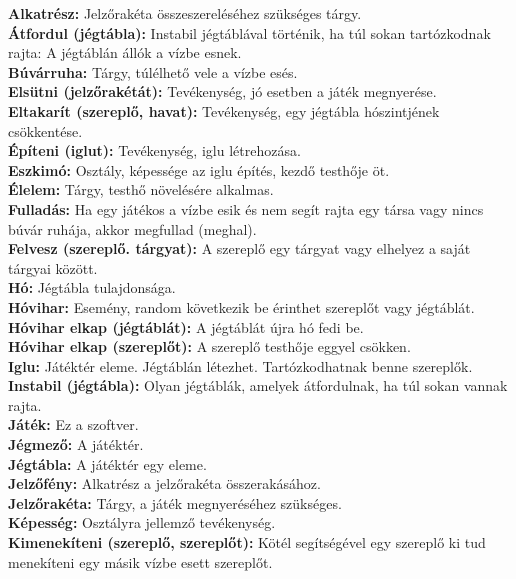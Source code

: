 \textbf{Alkatrész:} Jelzőrakéta összeszereléséhez szükséges tárgy. \\
\textbf{Átfordul (jégtábla):} Instabil jégtáblával történik, ha túl sokan  tartózkodnak rajta: A jégtáblán állók a vízbe esnek. \\
\textbf{Búvárruha:} Tárgy, túlélhető vele a vízbe esés. \\
\textbf{Elsütni (jelzőrakétát):} Tevékenység, jó esetben a játék megnyerése. \\
\textbf{Eltakarít (szereplő, havat):} Tevékenység, egy jégtábla hószintjének csökkentése. \\
\textbf{Építeni (iglut):} Tevékenység, iglu létrehozása. \\
\textbf{Eszkimó:} Osztály, képessége az iglu építés, kezdő testhője öt. \\
\textbf{Élelem:} Tárgy, testhő növelésére alkalmas. \\
\textbf{Fulladás:} Ha egy játékos a vízbe esik és nem segít rajta egy társa vagy nincs búvár ruhája, akkor megfullad (meghal). \\
\textbf{Felvesz (szereplő. tárgyat):} A szereplő egy tárgyat vagy elhelyez a saját tárgyai között. \\
\textbf{Hó:} Jégtábla tulajdonsága. \\
\textbf{Hóvihar:} Esemény, random következik be érinthet szereplőt vagy jégtáblát. \\
\textbf{Hóvihar elkap (jégtáblát):} A jégtáblát újra hó fedi be. \\
\textbf{Hóvihar elkap (szereplőt):} A szereplő testhője eggyel csökken. \\
\textbf{Iglu:} Játéktér eleme. Jégtáblán létezhet. Tartózkodhatnak benne szereplők. \\
\textbf{Instabil (jégtábla):} Olyan jégtáblák, amelyek átfordulnak, ha túl sokan vannak rajta. \\
\textbf{Játék:} Ez a szoftver. \\
\textbf{Jégmező:} A játéktér. \\
\textbf{Jégtábla:} A játéktér egy eleme. \\
\textbf{Jelzőfény:} Alkatrész a jelzőrakéta összerakásához. \\
\textbf{Jelzőrakéta:} Tárgy, a játék megnyeréséhez szükséges. \\
\textbf{Képesség:} Osztályra jellemző tevékenység. \\
\textbf{Kimenekíteni (szereplő, szereplőt):} Kötél segítségével egy szereplő ki tud menekíteni egy másik vízbe esett szereplőt. \\
